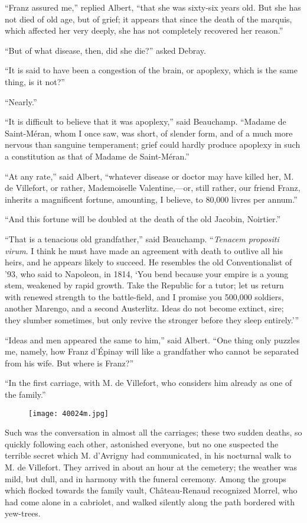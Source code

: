 “Franz assured me,” replied Albert, “that she was sixty-six years old.
But she has not died of old age, but of grief; it appears that since
the death of the marquis, which affected her very deeply, she has not
completely recovered her reason.”

“But of what disease, then, did she die?” asked Debray.

“It is said to have been a congestion of the brain, or apoplexy, which
is the same thing, is it not?”

“Nearly.”

“It is difficult to believe that it was apoplexy,” said Beauchamp.
“Madame de Saint-Méran, whom I once saw, was short, of slender form,
and of a much more nervous than sanguine temperament; grief could
hardly produce apoplexy in such a constitution as that of Madame de
Saint-Méran.”

“At any rate,” said Albert, “whatever disease or doctor may have killed
her, M. de Villefort, or rather, Mademoiselle Valentine,—or, still
rather, our friend Franz, inherits a magnificent fortune, amounting, I
believe, to 80,000 livres per annum.”

“And this fortune will be doubled at the death of the old Jacobin,
Noirtier.”

“That is a tenacious old grandfather,” said Beauchamp. “\textit{Tenacem
propositi virum}. I think he must have made an agreement with death to
outlive all his heirs, and he appears likely to succeed. He resembles
the old Conventionalist of ’93, who said to Napoleon, in 1814, ‘You
bend because your empire is a young stem, weakened by rapid growth.
Take the Republic for a tutor; let us return with renewed strength to
the battle-field, and I promise you 500,000 soldiers, another Marengo,
and a second Austerlitz. Ideas do not become extinct, sire; they
slumber sometimes, but only revive the stronger before they sleep
entirely.’”

“Ideas and men appeared the same to him,” said Albert. “One thing only
puzzles me, namely, how Franz d’Épinay will like a grandfather who
cannot be separated from his wife. But where is Franz?”

“In the first carriage, with M. de Villefort, who considers him already
as one of the family.”

\begin{figure}[ht]
\texttt{[image: 40024m.jpg]}
\end{figure}

Such was the conversation in almost all the carriages; these two sudden
deaths, so quickly following each other, astonished everyone, but no
one suspected the terrible secret which M. d’Avrigny had communicated,
in his nocturnal walk to M. de Villefort. They arrived in about an hour
at the cemetery; the weather was mild, but dull, and in harmony with
the funeral ceremony. Among the groups which flocked towards the family
vault, Château-Renaud recognized Morrel, who had come alone in a
cabriolet, and walked silently along the path bordered with yew-trees.

